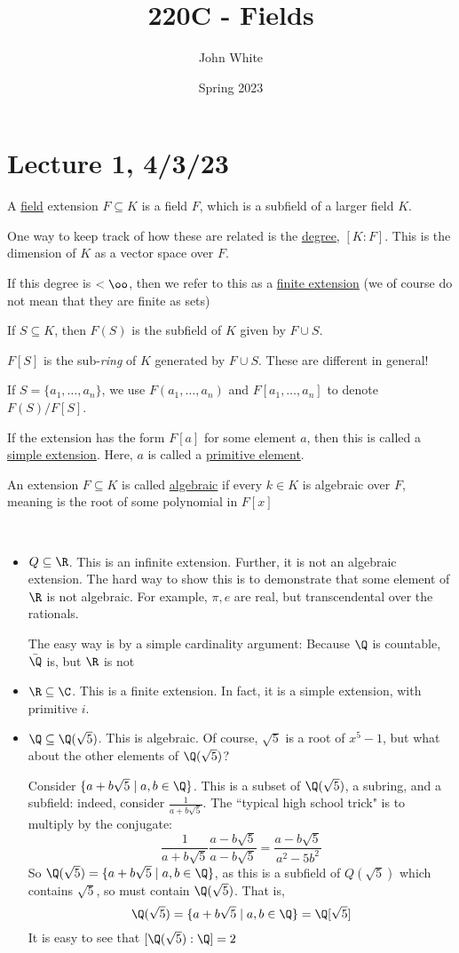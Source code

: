 \documentclass[x11names,reqno,14pt]{extarticle}
\title{220C - Fields}
\author{John White}
\date{Spring 2023}
\begin{document}
\section*{Lecture 1, 4/3/23}


A \underline{field} extension $F \subseteq K$ is a field $F$, which is a subfield of a larger field $K$.

One way to keep track of how these are related is the \underline{degree}, $[K:F]$. This is the dimension of $K$ as a vector space over $F$. 

If this degree is $<\oo$, then we refer to this as a \underline{finite extension} (we of course do not mean that they are finite as sets)

If $S \subseteq K$, then $F(S)$ is the subfield of $K$ given by $F \cup S$.

$F[S]$ is the sub-\textit{ring} of $K$ generated by $F \cup S$. These are different in general!

If $S = \{a_1,\dots, a_n\}$, we use $F(a_1, \dots, a_n)$ and $F[a_1,\dots, a_n]$ to denote $F(S)/F[S]$. 

If the extension has the form $F[a]$ for some element $a$, then this is called a \underline{simple extension}. Here, $a$ is called a \underline{primitive element}.

An extension $F \subseteq K$ is called \underline{algebraic} if every $k \in K$ is algebraic over $F$, meaning is the root of some polynomial in $F[x]$

\exm\,

\begin{itemize}

\item $Q \subseteq \R$. This is an infinite extension. Further, it is not an algebraic extension. The hard way to show this is to demonstrate that some element of $\R$ is not algebraic. For example, $\pi,e$ are real, but transcendental over the rationals. 

The easy way is by a simple cardinality argument: Because $\Q$ is countable, $\bar{\Q}$ is, but $\R$ is not

\item $\R\subseteq\C$. This is a finite extension. In fact, it is a simple extension, with primitive $i$.

\item $\Q\subseteq\Q(\sqrt{5})$. This is algebraic. Of course, $\sqrt{5}$ is a root of $x^5 - 1$, but what about the other elements of $\Q(\sqrt{5})$? 

Consider $\{a + b\sqrt{5} \mid a, b \in \Q\}$. This is a subset of $\Q(\sqrt{5})$, a subring, and a subfield: indeed, consider $\frac{1}{a + b\sqrt{5}}$. The ``typical high school trick" is to multiply by the conjugate:
\[
\frac{1}{a + b\sqrt{5}}\frac{a - b\sqrt{5}}{a - b\sqrt{5}} = \frac{a - b\sqrt{5}}{a^2 - 5b^2}
\]
So $\Q(\sqrt{5}) = \{a + b\sqrt{5} \mid a, b \in \Q\}$, as this is a subfield of $Q(\sqrt{5})$ which contains $\sqrt{5}$, so must contain $\Q(\sqrt{5})$. That is, 
\[
\Q(\sqrt{5}) = \{a + b\sqrt{5}\mid a, b \in \Q\} = \Q[\sqrt{5}]
\]
It is easy to see that $[\Q(\sqrt{5}):\Q] = 2$

\end{itemize}
\end{document}
